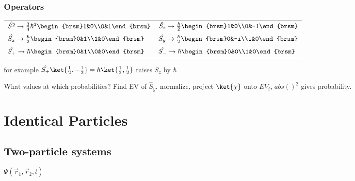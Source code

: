\documentclass[10pt,a4paper]{scrartcl}
\begin{document}
\begin{multicols*}{3}
	\subsubsection{Operators}
	\begin{tabular}{ll}
	$\hat{S^2}\rightarrow\frac{3}{4}\hbar^2\begin{brsm}1&0\\0&1\end{brsm}$&$ \hat{S_z}\rightarrow\frac{\hbar}{2}\begin{brsm}1&0\\0&-1\end{brsm}$\\
	$\hat{S_x}\rightarrow\frac{\hbar}{2}\begin{brsm}0&1\\1&0\end{brsm}$&$\hat{S_y}\rightarrow\frac{\hbar}{2}\begin{brsm}0&-i\\i&0\end{brsm}$\\
	$\hat{S_+}\rightarrow\hbar\begin{brsm}0&1\\0&0\end{brsm}$&$\hat{S_-}\rightarrow\hbar\begin{brsm}0&0\\1&0\end{brsm}$
	\end{tabular}

	\finn
	
	for example $\hat{S_+}\ket{\frac{1}{2},-\frac{1}{2}}=\hbar\ket{\frac{1}{2},\frac{1}{2}}$ raises $S_z$ by $\hbar$
	
	What values at which probabilities? \dahe Find EV of $\hat{S}_y$, normalize, project $\ket{\chi}$ onto $EV_i$, $abs()^2$ gives probability.
	
	\section{Identical Particles}
	
	\subsection{Two-particle systems}
	
	$\Psi(\vec{r}_1,\vec{r}_2,t)$
	
	

\end{multicols*}
\end{document}
